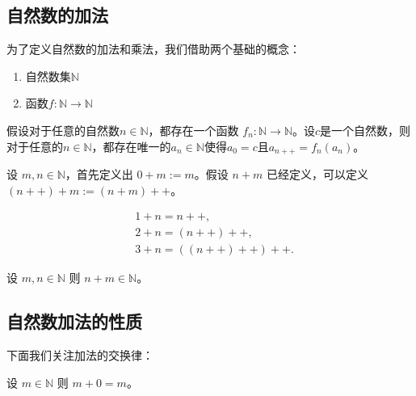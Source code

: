 \subsection{自然数的加法}

为了定义自然数的加法和乘法，我们借助两个基础的概念：

\begin{enumerate}
	\item 自然数集$\mathbb N$
	\item 函数$f:\mathbb N \rightarrow \mathbb N$
\end{enumerate}

\begin{theorem}[递归定义]\label{thm:RecursiveDefinition}
	假设对于任意的自然数$n\in \mathbb N$，都存在一个函数 $f_n:\mathbb N\rightarrow \mathbb N$。设$c$是一个自然数，则对于任意的$n\in \mathbb N$，都存在唯一的$a_n\in \mathbb N$使得$a_0=c$且$a_{n++} = f_n(a_n)$。
\end{theorem}


\begin{definition}[自然数的加法]
	设 $m,n\in \mathbb{N}$，首先定义出 $0+m:=m$。假设 $n+m$ 已经定义，可以定义$(n++)+m:=(n+m)++$。
\end{definition}


\[
\begin{aligned}
	&1+n=n++,\\
	&2+n=(n++)++,\\
	&3+n=((n++)++)++.
\end{aligned}
\]

\begin{theorem}[封闭性]
	设 $m,n\in \mathbb N$ 则 $n+m\in \mathbb N$。
\end{theorem}

\subsection{自然数加法的性质}

下面我们关注加法的交换律：

\begin{lemma}\label{lem1}
	设 $m\in \mathbb N$ 则 $m+0=m$。
\end{lemma}


